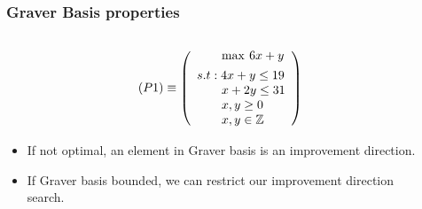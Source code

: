 \documentclass{beamer}
\begin{document}
    \begin{frame}
        \frametitle{Graver Basis properties}
        
        \begin{columns}[T] %
        \begin{column}{.48\textwidth}
        \begin{equation*}
            (P1) \equiv 	\left( \begin{array}{l}
	                        \qquad \max \hspace{2pt}  6x + y  \vspace{4pt} \\ 
	                        s.t: 4x + y \leq 19 \\
	                        \qquad x + 2y \leq 31 \\
	                        \qquad x,y\geq 0 \\
	                        \qquad x,y \in \mathbb{Z}
	                        \end{array} \right)
        \end{equation*}
        \begin{itemize}
            \justifying
            \item If not optimal, an element in Graver basis is an improvement direction.
            \item If Graver basis bounded, we can restrict our improvement direction search.
        \end{itemize}
        \end{column}%
        \hfill%
        \begin{column}{.48\textwidth}

\end{column}
\end{columns}
\end{frame}
\end{document}
